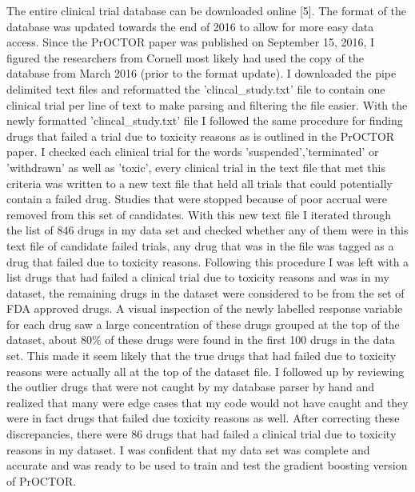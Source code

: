 \documentclass[12pt]{article}
\begin{document}
The entire clinical trial database can be downloaded online [5]. The format of the database was updated towards the end of 2016 to allow for more easy data access. Since the PrOCTOR paper was published on September 15, 2016, I figured the researchers from Cornell most likely had used the copy of the database from March 2016 (prior to the format update). I downloaded the pipe delimited text files and reformatted the 'clincal_study.txt' file to contain one clinical trial per line of text to make parsing and filtering the file easier. With the newly formatted 'clincal_study.txt' file I followed the same procedure for finding drugs that failed a trial due to toxicity reasons as is outlined in the PrOCTOR paper. I checked each clinical trial for the words 'suspended','terminated' or 'withdrawn' as well as 'toxic', every clinical trial in the text file that met this criteria was written to a new text file that held all trials that could potentially contain a failed drug. Studies that were stopped because of poor accrual were removed from this set of candidates. With this new text file I iterated through the list of 846 drugs in my data set and checked whether any of them were in this text file of candidate failed trials, any drug that was in the file was tagged as a drug that failed due to toxicity reasons. Following this procedure I was left with a list drugs that had failed a clinical trial due to toxicity reasons and was in my dataset, the remaining drugs in the dataset were considered to be from the set of FDA approved drugs. A visual inspection of the newly labelled response variable for each drug saw a large concentration of these drugs grouped at the top of the dataset, about 80\% of these drugs were found in the first 100 drugs in the data set. This made it seem likely that the true drugs that had failed due to toxicity reasons were actually all at the top of the dataset file. I followed up by reviewing the outlier drugs that were not caught by my database parser by hand and realized that many were edge cases that my code would not have caught and they were in fact drugs that failed due toxicity reasons as well. After correcting these discrepancies, there were 86 drugs that had failed a clinical trial due to toxicity reasons in my dataset. I was confident that my data set was complete and accurate and was ready to be used to train and test the gradient boosting version of PrOCTOR.
\end{document}
